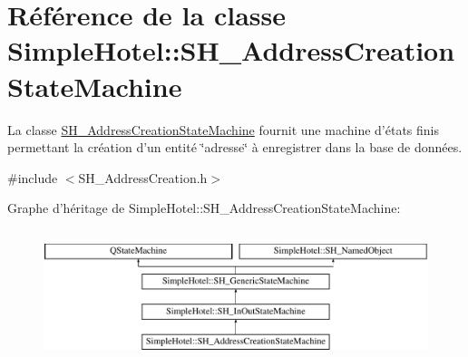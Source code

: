 \hypertarget{classSimpleHotel_1_1SH__AddressCreationStateMachine}{\section{Référence de la classe Simple\-Hotel\-:\-:S\-H\-\_\-\-Address\-Creation\-State\-Machine}
\label{classSimpleHotel_1_1SH__AddressCreationStateMachine}
}


La classe \hyperlink{classSimpleHotel_1_1SH__AddressCreationStateMachine}{S\-H\-\_\-\-Address\-Creation\-State\-Machine} fournit une machine d'états finis permettant la création d'un entité \char`\"{}adresse\char`\"{} à enregistrer dans la base de données.  




{\ttfamily \#include $<$S\-H\-\_\-\-Address\-Creation.\-h$>$}

Graphe d'héritage de Simple\-Hotel\-:\-:S\-H\-\_\-\-Address\-Creation\-State\-Machine\-:\begin{figure}[H]
\begin{center}
\leavevmode
\includegraphics[height=3.888889cm]{classSimpleHotel_1_1SH__AddressCreationStateMachine}
\end{center}
\end{figure}
